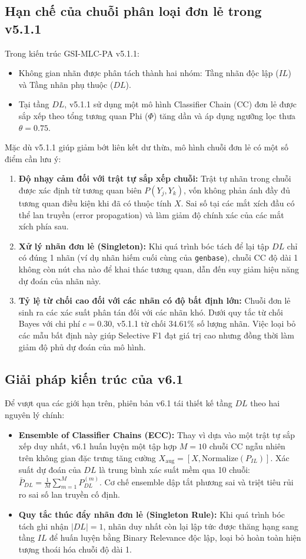 \documentclass[11pt,a4paper]{article}
\begin{document}
\subsection{Hạn chế của chuỗi phân loại đơn lẻ trong v5.1.1}
Trong kiến trúc GSI-MLC-PA v5.1.1:
\begin{itemize}
    \item Không gian nhãn được phân tách thành hai nhóm: Tầng nhãn độc lập ($IL$) và Tầng nhãn phụ thuộc ($DL$).
    \item Tại tầng $DL$, v5.1.1 sử dụng một mô hình Classifier Chain (CC) đơn lẻ được sắp xếp theo tổng tương quan Phi ($\Phi$) tăng dần và áp dụng ngưỡng lọc thưa $\theta = 0.75$.
\end{itemize}
Mặc dù v5.1.1 giúp giảm bớt liên kết dư thừa, mô hình chuỗi đơn lẻ có một số điểm cần lưu ý:
\begin{enumerate}
    \item \textbf{Độ nhạy cảm đối với trật tự sắp xếp chuỗi:} Trật tự nhãn trong chuỗi được xác định từ tương quan biên $P(Y_j, Y_k)$, vốn không phản ánh đầy đủ tương quan điều kiện khi đã có thuộc tính $X$. Sai số tại các mắt xích đầu có thể lan truyền (error propagation) và làm giảm độ chính xác của các mắt xích phía sau.
    \item \textbf{Xử lý nhãn đơn lẻ (Singleton):} Khi quá trình bóc tách để lại tập $DL$ chỉ có đúng 1 nhãn (ví dụ nhãn hiếm cuối cùng của \texttt{genbase}), chuỗi CC độ dài 1 không còn nút cha nào để khai thác tương quan, dẫn đến suy giảm hiệu năng dự đoán của nhãn này.
    \item \textbf{Tỷ lệ từ chối cao đối với các nhãn có độ bất định lớn:} Chuỗi đơn lẻ sinh ra các xác suất phân tán đối với các nhãn khó. Dưới quy tắc từ chối Bayes với chi phí $c = 0.30$, v5.1.1 từ chối $34.61\%$ số lượng nhãn. Việc loại bỏ các mẫu bất định này giúp Selective F1 đạt giá trị cao nhưng đồng thời làm giảm độ phủ dự đoán của mô hình.
\end{enumerate}

\subsection{Giải pháp kiến trúc của v6.1}
Để vượt qua các giới hạn trên, phiên bản v6.1 tái thiết kế tầng $DL$ theo hai nguyên lý chính:
\begin{itemize}
    \item \textbf{Ensemble of Classifier Chains (ECC):} Thay vì dựa vào một trật tự sắp xếp duy nhất, v6.1 huấn luyện một tập hợp $M = 10$ chuỗi CC ngẫu nhiên trên không gian đặc trưng tăng cường $X_{\text{aug}} = [X, \text{Normalize}(P_{IL})]$. Xác suất dự đoán của $DL$ là trung bình xác suất mềm qua 10 chuỗi: $\bar{P}_{DL} = \frac{1}{M}\sum_{m=1}^M P_{DL}^{(m)}$. Cơ chế ensemble dập tắt phương sai và triệt tiêu rủi ro sai số lan truyền cố định.
    \item \textbf{Quy tắc thúc đẩy nhãn đơn lẻ (Singleton Rule):} Khi quá trình bóc tách ghi nhận $|DL| = 1$, nhãn duy nhất còn lại lập tức được thăng hạng sang tầng $IL$ để huấn luyện bằng Binary Relevance độc lập, loại bỏ hoàn toàn hiện tượng thoái hóa chuỗi độ dài 1.
\end{itemize}
\end{document}
